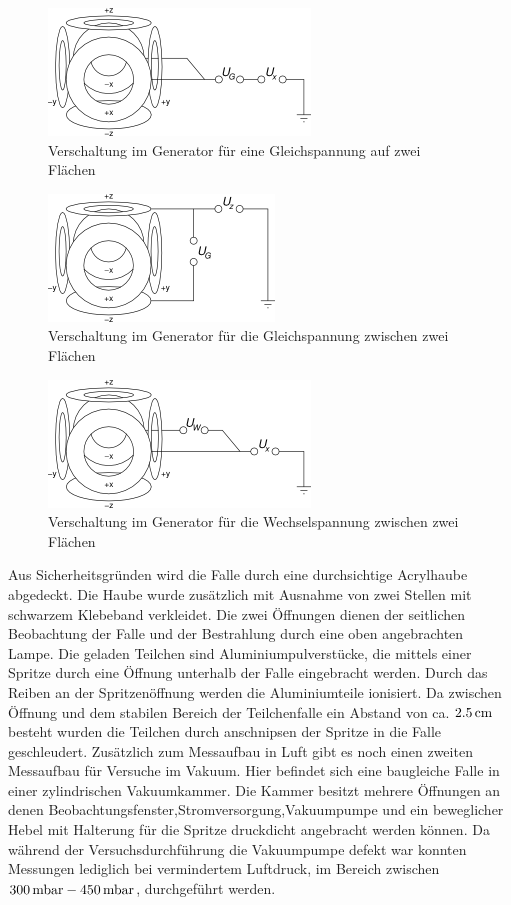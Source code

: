 \documentclass[a4paper,12pt]{article}
\begin{document}
\begin{figure}[htb]
		\centering
		\includegraphics{Schaltbild_Stabilitaet.png}
		\caption{Verschaltung im Generator für eine Gleichspannung auf zwei Flächen}
		\label{verschaltungstab}
\end{figure}

\begin{figure}[htb]
		\centering
		\includegraphics{Schaltbild_Z_Kompensation.png}
		\caption{Verschaltung im Generator für die Gleichspannung zwischen zwei Flächen}
		\label{verschaltungz}
\end{figure}

\begin{figure}[htb]
		\centering
		\includegraphics{Schaltbild_Wechselspannung.png}
		\caption{Verschaltung im Generator für die Wechselspannung zwischen zwei Flächen}
		\label{verschaltungres}
\end{figure}
Aus Sicherheitsgründen wird die Falle durch eine durchsichtige Acrylhaube abgedeckt.
Die Haube wurde zusätzlich mit Ausnahme von zwei Stellen mit schwarzem Klebeband verkleidet.
Die zwei Öffnungen dienen der seitlichen Beobachtung der Falle und der Bestrahlung durch eine oben angebrachten Lampe.
Die geladen Teilchen sind Aluminiumpulverstücke, die mittels einer Spritze durch eine Öffnung unterhalb der Falle eingebracht werden.
Durch das Reiben an der Spritzenöffnung werden die Aluminiumteile ionisiert.
Da zwischen Öffnung und dem stabilen Bereich der Teilchenfalle ein Abstand von ca. $\unit[2.5]{cm}$  besteht wurden die Teilchen durch anschnipsen der Spritze in die Falle geschleudert.
Zusätzlich zum Messaufbau in Luft gibt es noch einen zweiten Messaufbau für Versuche im Vakuum. Hier befindet sich eine baugleiche Falle in einer zylindrischen Vakuumkammer.
Die Kammer besitzt mehrere Öffnungen an denen Beobachtungsfenster,Stromversorgung,Vakuumpumpe und ein beweglicher Hebel mit Halterung für die Spritze druckdicht angebracht werden können.
 Da während der Versuchsdurchführung die Vakuumpumpe defekt war 
konnten Messungen lediglich bei vermindertem Luftdruck, im Bereich zwischen $\unit[300]{mbar} - \unit[450]{mbar}$, durchgeführt werden.  
\end{document}
